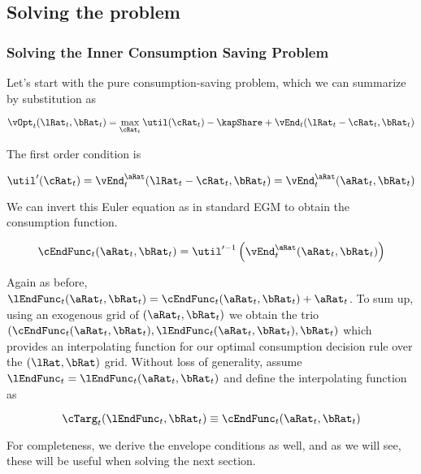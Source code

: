 \documentclass[\econtexRoot/SequentialEGM]{subfiles}
\begin{document}
\subsection{Solving the problem}

\subsubsection{Solving the Inner Consumption Saving Problem}

Let's start with the pure consumption-saving problem, which we can summarize by
substitution as

\begin{equation}
	\vOpt_{t}(\lRat_{t}, \bRat_{t}) = \max_{\cRat_{t}} \util(\cRat_{t}) - \kapShare +
	\vEnd_{t}(\lRat_{t} - \cRat_{t}, \bRat_{t})
\end{equation}

The first order condition is

\begin{equation}
	\util'(\cRat_{t}) = \vEnd_{t}^{\aRat}(\lRat_{t}-\cRat_{t}, \bRat_{t}) =
	\vEnd_{t}^{\aRat}(\aRat_{t}, \bRat_{t})
\end{equation}

We can invert this Euler equation as in standard EGM to obtain the consumption
function.

\begin{equation}
	\cEndFunc_{t}(\aRat_{t}, \bRat_{t}) =
	\util'^{-1}\left(\vEnd_{t}^{\aRat}(\aRat_{t}, \bRat_{t})\right)
\end{equation}

Again as before, $\lEndFunc_{t}(\aRat_{t}, \bRat_{t}) =
	\cEndFunc_{t}(\aRat_{t}, \bRat_{t}) + \aRat_{t}$. To sum up, using an
exogenous
grid of $(\aRat_{t}, \bRat_{t})$ we obtain the trio $(\cEndFunc_{t}(\aRat_{t},
	\bRat_{t}), \lEndFunc_{t}(\aRat_{t},
	\bRat_{t}), \bRat_{t})$ which
provides an
interpolating function for our optimal consumption decision rule over the
$(\lRat, \bRat)$ grid. Without loss of generality, assume $\lEndFunc_{t} =
	\lEndFunc_{t}(\aRat_{t}, \bRat_{t})$ and define the interpolating
function as

\begin{equation}
	\cTarg_{t}(\lEndFunc_{t}, \bRat_{t}) \equiv \cEndFunc_{t}(\aRat_{t},
	\bRat_{t})
\end{equation}

For completeness, we derive the envelope conditions as well, and as we will
see, these will be useful when solving the next section.
\end{document}
